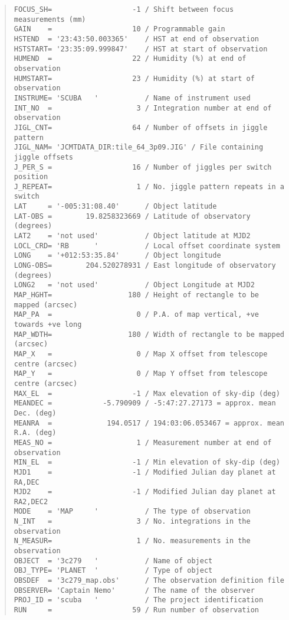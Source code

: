\documentclass[twoside,11pt]{article}
\newenvironment{myquote}{\begin{quote}\begin{small}}{\end{small}\end{quote}}
\begin{document}
\begin{myquote}
\begin{verbatim}
FOCUS_SH=                   -1 / Shift between focus measurements (mm)
GAIN    =                   10 / Programmable gain
HSTEND  = '23:43:50.003365'    / HST at end of observation
HSTSTART= '23:35:09.999847'    / HST at start of observation
HUMEND  =                   22 / Humidity (%) at end of observation
HUMSTART=                   23 / Humidity (%) at start of observation
INSTRUME= 'SCUBA   '           / Name of instrument used
INT_NO  =                    3 / Integration number at end of observation
JIGL_CNT=                   64 / Number of offsets in jiggle pattern
JIGL_NAM= 'JCMTDATA_DIR:tile_64_3p09.JIG' / File containing jiggle offsets
J_PER_S =                   16 / Number of jiggles per switch position
J_REPEAT=                    1 / No. jiggle pattern repeats in a switch
LAT     = '-005:31:08.40'      / Object latitude
LAT-OBS =        19.8258323669 / Latitude of observatory (degrees)
LAT2    = 'not used'           / Object latitude at MJD2
LOCL_CRD= 'RB      '           / Local offset coordinate system
LONG    = '+012:53:35.84'      / Object longitude
LONG-OBS=        204.520278931 / East longitude of observatory (degrees)
LONG2   = 'not used'           / Object Longitude at MJD2
MAP_HGHT=                  180 / Height of rectangle to be mapped (arcsec)
MAP_PA  =                    0 / P.A. of map vertical, +ve towards +ve long
MAP_WDTH=                  180 / Width of rectangle to be mapped (arcsec)
MAP_X   =                    0 / Map X offset from telescope centre (arcsec)
MAP_Y   =                    0 / Map Y offset from telescope centre (arcsec)
MAX_EL  =                   -1 / Max elevation of sky-dip (deg)
MEANDEC =            -5.790909 / -5:47:27.27173 = approx. mean Dec. (deg)
MEANRA  =             194.0517 / 194:03:06.053467 = approx. mean R.A. (deg)
MEAS_NO =                    1 / Measurement number at end of observation
MIN_EL  =                   -1 / Min elevation of sky-dip (deg)
MJD1    =                   -1 / Modified Julian day planet at RA,DEC
MJD2    =                   -1 / Modified Julian day planet at RA2,DEC2
MODE    = 'MAP     '           / The type of observation
N_INT   =                    3 / No. integrations in the observation
N_MEASUR=                    1 / No. measurements in the observation
OBJECT  = '3c279   '           / Name of object
OBJ_TYPE= 'PLANET  '           / Type of object
OBSDEF  = '3c279_map.obs'      / The observation definition file
OBSERVER= 'Captain Nemo'       / The name of the observer
PROJ_ID = 'scuba   '           / The project identification
RUN     =                   59 / Run number of observation

\end{verbatim}
\end{myquote}
\end{document}
